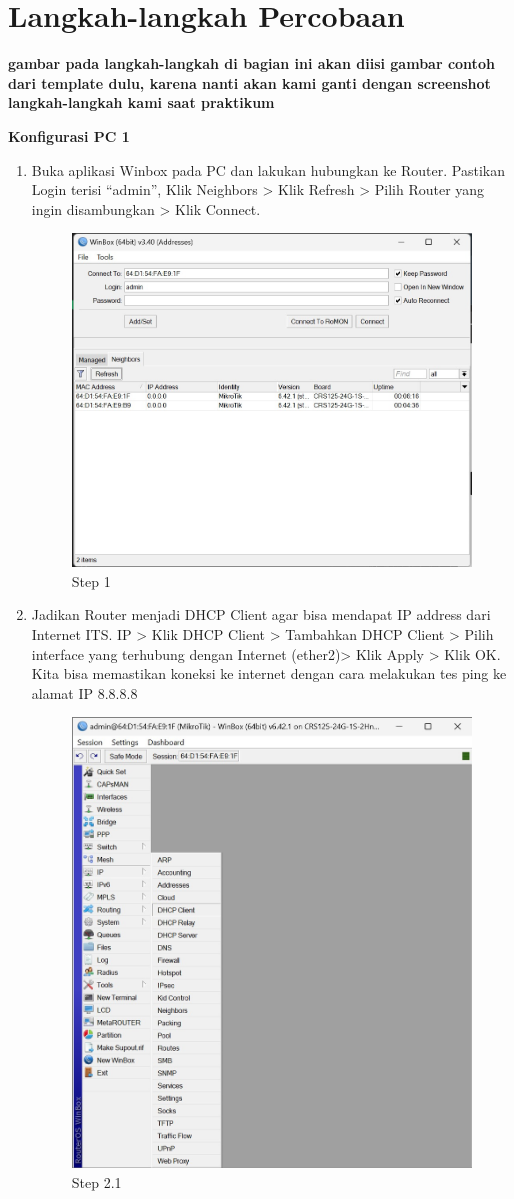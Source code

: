 \section{Langkah-langkah Percobaan}
\textbf{gambar pada langkah-langkah di bagian ini akan diisi gambar contoh dari template dulu,
		karena nanti akan kami ganti dengan screenshot langkah-langkah kami saat praktikum}

\begin{center} 
	\textbf{Konfigurasi PC 1}
\end{center}

\begin{enumerate}
	\item Buka aplikasi Winbox pada PC dan lakukan hubungkan ke Router. Pastikan Login terisi “admin”,
	Klik Neighbors > Klik Refresh > Pilih Router yang ingin disambungkan > Klik Connect.
	
	\begin{figure}[H]
		\centering
		\includegraphics[width=0.7\linewidth]{P4/img/step1.jpg}
		\caption{Step 1}
		\label{fig:gambar1}
	\end{figure}

	\item Jadikan Router menjadi DHCP Client agar bisa mendapat IP address dari Internet ITS. IP >
	Klik DHCP Client > Tambahkan DHCP Client > Pilih interface yang terhubung dengan Internet
	(ether2)> Klik Apply > Klik OK. Kita bisa memastikan koneksi ke internet dengan cara melakukan
	tes ping ke alamat IP 8.8.8.8
	
	\begin{figure}[H]
		\centering
		\includegraphics[width=0.5\linewidth]{P4/img/step2.1.jpg}
		\caption{Step 2.1}
		\label{fig:gambar2}
		

\end{figure}
\end{enumerate}
